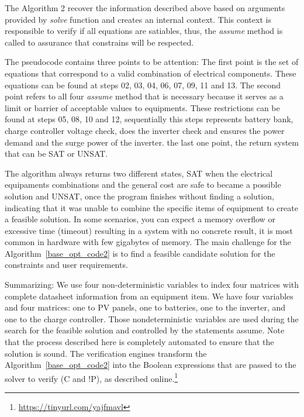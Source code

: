\documentclass[10pt,journal,compsoc]{IEEEtran}
\begin{document}
The Algorithm 2 recover the information described above based on arguments provided by \textit{solve} function and creates an internal context. This context is responsible to verify if all equations are satiables, thus, the \textit{assume} method is called to assurance that constrains will be respected.

The pseudocode contains three points to be attention: The first point is the set of equations that correspond to a valid combination of electrical components. These equations can be found at steps 02, 03, 04, 06, 07, 09, 11 and 13. The second point refers to all four \textit{assume} method that is necessary because it serves as a limit or barrier of acceptable values to equipments. These restrictions can be found at steps 05, 08, 10 and 12, sequentially this steps represents battery bank, charge controller voltage check, does the inverter check and ensures the power demand and the surge power of the inverter. the last one point, the return system that can be SAT or UNSAT. 

The algorithm always returns two different states, SAT when the electrical equipaments combinations and the general cost are safe to became a possible solution and  UNSAT, once the program finishes without finding a solution, indicating that it was unable to combine the specific items of equipment to create a feasible solution. In some scenarios, you can expect a memory overflow or excessive time (timeout) resulting in a system with no concrete result, it is most common in hardware with few gigabytes of memory. The main challenge for the Algorithm~\ref{base_opt_code2} is to find a feasible candidate solution for the constraints and user requirements.

\color{black}
Summarizing: We use four non-deterministic variables to index four matrices with complete datasheet information from an equipment item. We have four variables and four matrices: one to PV panels, one to batteries, one to the inverter, and one to the charge controller. Those nondeterministic variables are used during the search for the feasible solution and controlled by the statements assume. Note that the process described here is completely automated to ensure that the solution is sound. The verification engines transform the Algorithm~\ref{base_opt_code2} into the Boolean expressions that are passed to the solver to verify (C and !P), as described online.\footnote{\url{https://tinyurl.com/yajfmavl}}




\end{document}
